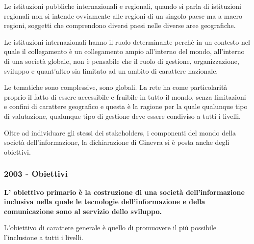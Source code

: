 Le istituzioni pubbliche internazionali e regionali, quando si parla di istituzioni regionali non si intende ovviamente alle regioni di un singolo paese ma a macro regioni, soggetti che comprendono diversi paesi nelle diverse aree geografiche. \par
Le istituzioni internazionali hanno il ruolo determinante perché in un contesto nel quale il collegamento è un collegamento ampio all'interno del mondo, all'interno di una società globale, non è pensabile che il ruolo di gestione, organizzazione, sviluppo e quant'altro sia limitato ad un ambito di carattere nazionale. \par
Le tematiche sono complessive, sono globali. La rete ha come particolarità proprio il fatto di essere accessibile e fruibile in tutto il mondo, senza limitazioni e confini di carattere geografico e questa è la ragione per la quale qualunque tipo di valutazione, qualunque tipo di gestione deve essere condiviso a tutti i livelli. \par
Oltre ad individuare gli stessi dei stakeholders, i componenti del mondo della società dell'informazione, la dichiarazione di Ginevra si è posta anche degli obiettivi. \par

\subsubsection{2003 - Obiettivi}

\textbf{L' obiettivo primario è la costruzione di una società dell'informazione inclusiva nella quale le tecnologie dell'informazione e della comunicazione sono al servizio dello sviluppo.}\par

L'obiettivo di carattere generale è quello di promuovere il più possibile l'inclusione a tutti i livelli.

